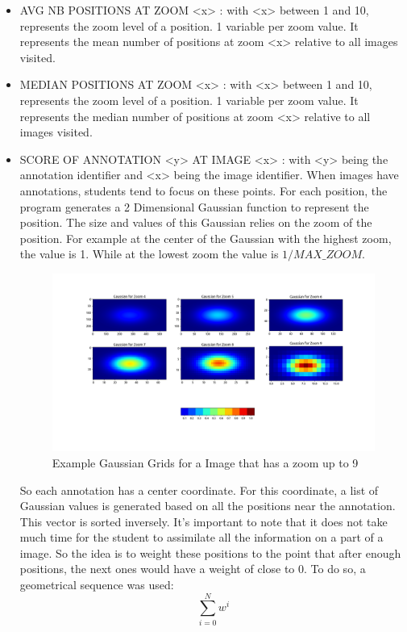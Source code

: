 \documentclass[a4paper,11pt]{report}
\numberwithin{figure}{section} %
\begin{document}
\begin{itemize}
    \item[\textbullet] AVG NB POSITIONS AT ZOOM <x> : with <x> between 1 and 10, represents the zoom level of a position. 1 variable per zoom value. It represents the mean number of positions at zoom <x> relative to all images visited.\\
    \item[\textbullet] MEDIAN POSITIONS AT ZOOM <x> : with <x> between 1 and 10, represents the zoom level of a position. 1 variable per zoom value. It represents the median number of positions at zoom <x> relative to all images visited.\\
    \item[\textbullet] SCORE OF ANNOTATION <y> AT IMAGE <x> : with <y> being the annotation identifier and <x> being the image identifier. When images have annotations, students tend to focus on these points. For each position, the program generates a 2 Dimensional Gaussian function to represent the position. The size and values of this Gaussian relies on the zoom of the position. For example at the center of the Gaussian with the highest zoom, the value is 1. While at the lowest zoom the value is $1/MAX\_ZOOM$. 
    \begin{figure}[H]
\begin{center}
\includegraphics[scale=0.35]{gaussian.png}
\caption{Example Gaussian Grids for a Image that has a zoom up to 9}
\end{center}
\end{figure} 
   
   So each annotation has a center coordinate. For this coordinate, a list of Gaussian values is generated based on all the positions near the annotation. This vector is sorted inversely. It's important to note that it does not take much time for the student to assimilate all the information on a part of a image. So the idea is to weight these positions to the point that after enough positions, the next ones would have a weight of close to 0.
To do so, a geometrical sequence was used:  
	$$\sum\limits_{i=0}^N w^i$$


\end{itemize}
\end{document}
